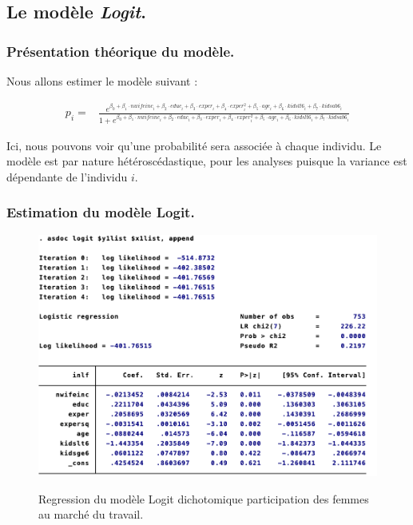 \subsection*{Le modèle \emph{Logit}.}

\subsubsection*{Présentation théorique du modèle.}

Nous allons estimer le modèle suivant : 

\begin{align*}
   p_i = & \frac{e^{\beta_0 + \beta_1 \cdot nwifeinc_i + \beta_2 \cdot educ_i + \beta_3 \cdot exper_i + \beta_4 \cdot exper_i^2 + \beta_5 \cdot age_i + \beta_6 \cdot kidslt6_i + \beta_7 \cdot kidsab6_i}}{1+e^{\beta_0 + \beta_1 \cdot nwifeinc_i + \beta_2 \cdot educ_i + \beta_3 \cdot exper_i + \beta_4 \cdot exper_i^2 + \beta_5 \cdot age_i + \beta_6 \cdot kidslt6_i + \beta_7 \cdot kidsab6_i}}
\end{align*}

Ici, nous pouvons voir qu'une probabilité sera associée à chaque individu. Le modèle est par nature hétéroscédastique, pour les analyses puisque la variance est dépendante de l'individu $i$. 

\subsubsection*{Estimation du modèle Logit.}

\begin{figure}[h]
    \caption{Regression du modèle Logit dichotomique participation des femmes au marché du travail.}
    \includegraphics[scale = 0.8]{100_tab_results/partie1logitdicho.png}
    \centering
    \label{reg:Logitdichotomique}
\end{figure}


